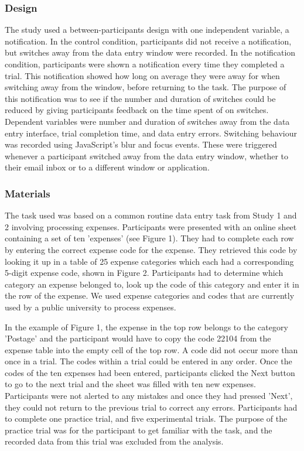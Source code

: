 \subsubsection{Design}
The study used a between-participants design with one independent variable, a notification. In the control condition, participants did not receive a notification, but switches away from the data entry window were recorded. In the notification condition, participants were shown a notification every time they completed a trial. This notification showed how long on average they were away for when switching away from the window, before returning to the task. The purpose of this notification was to see if the number and duration of switches could be reduced by giving participants feedback on the time spent of on switches. Dependent variables were number and duration of switches away from the data entry interface, trial completion time, and data entry errors. Switching behaviour was recorded using JavaScript's blur and focus events. These were triggered whenever a participant switched away from the data entry window, whether to their email inbox or to a different window or application. 

\subsubsection{Materials}
The task used was based on a common routine data entry task from Study 1 and 2 involving processing expenses. Participants were presented with an online sheet containing a set of ten 'expenses' (see Figure 1). They had to complete each row by entering the correct expense code for the expense. They retrieved this code by looking it up in a table of 25 expense categories which each had a corresponding 5-digit expense code, shown in Figure 2. Participants had to determine which category an expense belonged to, look up the code of this category and enter it in the row of the expense. We used expense categories and codes that are currently used by a public university to process expenses.

In the example of Figure 1, the expense in the top row belongs to the category 'Postage' and the participant would have to copy the code 22104 from the expense table into the empty cell of the top row. A code did not occur more than once in a trial. The codes within a trial could be entered in any order. 
Once the codes of the ten expenses had been entered, participants clicked the Next button to go to the next trial and the sheet was filled with ten new expenses. Participants were not alerted to any mistakes and once they had pressed 'Next', they could not return to the previous trial to correct any errors. Participants had to complete one practice trial, and five experimental trials. The purpose of the practice trial was for the participant to get familiar with the task, and the recorded data from this trial was excluded from the analysis.

